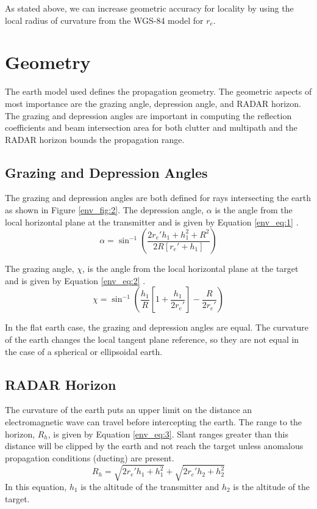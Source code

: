 As stated above, we can increase geometric accuracy for locality by using the local radius of curvature from the WGS-84 model for $r_e$.

\section{Geometry}
The earth model used defines the propagation geometry. The geometric aspects of most importance are the grazing angle, depression angle, and RADAR horizon. The grazing and depression angles are important in computing the reflection coefficients and beam intersection area for both clutter and multipath and the RADAR horizon bounds the propagation range.

\subsection{Grazing and Depression Angles}
The grazing and depression angles are both defined for rays intersecting the earth as shown in Figure \ref{env_fig:2}. The depression angle, $\alpha$ is the angle from the local horizontal plane at the transmitter and is given by Equation \ref{env_eq:1} \cite{nathanson_radar}.
\begin{equation}
  \label{env_eq:1}
  \alpha = \sin^{-1}\left(\frac{2r_e'h_1 + h_1^2 + R^2}{2R\left[r_e' + h_1 \right]} \right)
  \end{equation}
  
The grazing angle, $\chi$, is the angle from the local horizontal plane at the target and is given by Equation \ref{env_eq:2} \cite{nathanson_radar}.
  \begin{equation}
  \label{env_eq:2}
  \chi = \sin^{-1}\left(\frac{h_1}{R}\left[1 + \frac{h_1}{2r_e'} \right] - \frac{R}{2r_e'} \right)
  \end{equation}
  
In the flat earth case, the grazing and depression angles are equal. The curvature of the earth changes the local tangent plane reference, so they are not equal in the case of a spherical or ellipsoidal earth.
  
\subsection{RADAR Horizon}
The curvature of the earth puts an upper limit on the distance an electromagnetic wave can travel before intercepting the earth. The range to the horizon, $R_h$, is given by Equation \ref{env_eq:3}. Slant ranges greater than this distance will be clipped by the earth and not reach the target unless anomalous propagation conditions (ducting) are present.
  \begin{equation}
  \label{env_eq:3}
  R_h = \sqrt{2r_e'h_1 + h_1^2} + \sqrt{2r_e'h_2 + h_2^2}
  \end{equation}
In this equation, $h_1$ is the altitude of the transmitter and $h_2$ is the altitude of the target.

